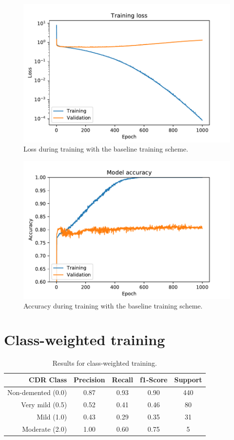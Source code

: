 \documentclass{kththesis}
\begin{document}
\begin{figure}[H]
  \centering
  \includegraphics[width=0.9\linewidth]{img/loss_default.pdf}
  \caption{Loss during training with the baseline training scheme.} \label{fig:loss_default}
\end{figure}
\begin{figure}[H]
  \vspace{-3mm}
  \centering
  \includegraphics[width=0.9\linewidth]{img/accuracy_default.pdf}
  \caption{Accuracy during training with the baseline training scheme.} \label{fig:accuracy_default}
\end{figure}


\section{Class-weighted training}
\begin{table}[H]
  \begin{center}
    \caption{Results for class-weighted training. \label{tab:results_class_weighted}}
    \begin{tabular}{r|ccc|c}
      \textbf{CDR Class} & \textbf{Precision} & \textbf{Recall} & \textbf{f1-Score} & \textbf{Support} \\
      \toprule
      Non-demented (0.0) & 0.87 & 0.93 & 0.90 & 440 \\
      Very mild (0.5) & 0.52 & 0.41 & 0.46 & 80  \\
      Mild (1.0)         & 0.43 & 0.29 & 0.35 & 31  \\
      Moderate (2.0)     & 1.00 & 0.60 & 0.75 & 5   \\
    \end{tabular}
  \end{center}
\end{table}
\end{document}
